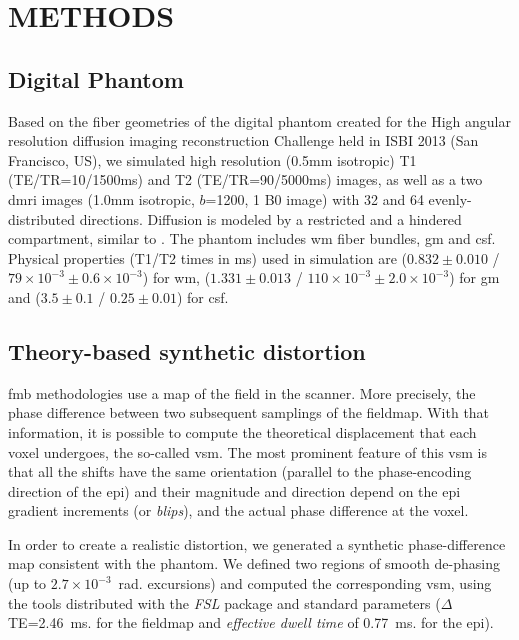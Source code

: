 \section{METHODS}

\subsection{Digital Phantom}
Based on the fiber geometries of the digital phantom 
created for the High angular resolution diffusion imaging 
reconstruction Challenge held in ISBI 2013 
(San Francisco, US), we simulated high resolution 
(0.5mm isotropic) T1 (TE/TR=10/1500ms) and T2 
(TE/TR=90/5000ms) images, as well as a two \gls*{dmri}
images (1.0mm isotropic, $b$=1200, 1 B0 image) with
32 and 64 evenly-distributed directions.
Diffusion is modeled by a restricted and a hindered
compartment, similar to \cite{assaf_composite_2005}.
The phantom includes \gls*{wm} fiber bundles,
\gls*{gm} and \gls*{csf}. Physical properties
(T1/T2 times in ms) used in simulation are
($0.832\pm0.010$ / $79\times10^{-3}\pm0.6\times10^{-3}$)
for \gls*{wm},
($1.331\pm0.013$ / $110\times10^{-3}\pm2.0\times10^{-3}$) for
\gls*{gm} and ($3.5\pm0.1$ / $0.25\pm0.01$) for \gls*{csf}.

\subsection{Theory-based synthetic distortion}
\label{sec:distortion}
\Gls*{fmb} methodologies use a map
of the field in the scanner. More precisely, the
phase difference between two subsequent samplings
of the fieldmap. With that information, it is possible
to compute the theoretical displacement that each
voxel undergoes, the so-called \gls*{vsm}. The
most prominent feature of this \gls*{vsm} is that all
the shifts have the same orientation (parallel to the
phase-encoding direction of the \gls*{epi}) and their
magnitude and direction depend on the \gls*{epi} 
gradient increments (or \emph{blips}), and the actual
phase difference at the voxel.

In order to create a realistic distortion, we
generated a synthetic phase-difference map 
consistent with the phantom.  We defined two regions 
of smooth de-phasing (up to $2.7\times10^{-3}$~rad. excursions) 
and computed the corresponding \gls*{vsm}, using the 
tools distributed with the \emph{FSL} package 
\cite{jenkinson_fsl_2012}  and
standard parameters ($\Delta$TE=2.46~ms. for the
fieldmap and \emph{effective dwell time} of 
0.77~ms. for the \gls*{epi}).

